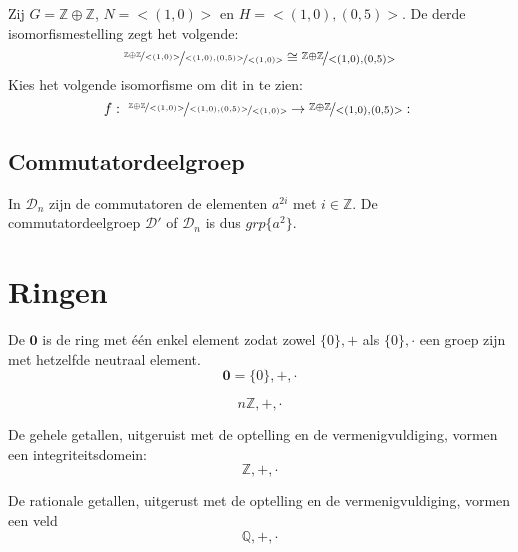 \documentclass[main.tex]{subfiles}
\begin{document}
\begin{vb}
  Zij $G = \mathbb{Z} \oplus \mathbb{Z}$, $N = <(1,0)>$ en $H=<(1,0),(0,5)>$.
  De derde isomorfismestelling zegt het volgende:
  \[
  \nicefrac{\nicefrac{\mathbb{Z} \oplus \mathbb{Z}}{<(1,0)>}}{\nicefrac{<(1,0),(0,5)>}{<(1,0)>}} \cong \nicefrac{\mathbb{Z} \oplus \mathbb{Z}}{<(1,0),(0,5)>}
  \]
  Kies het volgende isomorfisme om dit in te zien:
  \[ f:\ \nicefrac{\nicefrac{\mathbb{Z} \oplus \mathbb{Z}}{<(1,0)>}}{\nicefrac{<(1,0),(0,5)>}{<(1,0)>}} \rightarrow \nicefrac{\mathbb{Z} \oplus \mathbb{Z}}{<(1,0),(0,5)>}:\ \]
\end{vb}


\subsection{Commutatordeelgroep}

\begin{vb}
  In $\mathcal{D}_{n}$ zijn de commutatoren de elementen $a^{2i}$ met $i\in\mathbb{Z}$.
  De commutatordeelgroep $\mathcal{D}'$ of $\mathcal{D}_{n}$ is dus $grp\{a^{2}\}$.
\end{vb}



\section{Ringen}
\label{sec:ringen}

\begin{de}
  De  $\boldsymbol{0}$ is de ring met \'e\'en enkel element zodat zowel $\{0\},+$ als $\{0\},\cdot$ een groep zijn met hetzelfde neutraal element.
  \[ \boldsymbol{0} = \{0\},+,\cdot \]
  \commj {}
\end{de}

\begin{vb}
  \[ n\mathbb{Z},+,\cdot \]
  \commj {} \domein
\end{vb}

\begin{vb}
  De gehele getallen, uitgeruist met de optelling en de vermenigvuldiging, vormen een integriteitsdomein:
  \[ \mathbb{Z},+,\cdot \]
  \commj {} \domein
\end{vb}

\begin{vb}
  De rationale getallen, uitgerust met de optelling en de vermenigvuldiging, vormen een veld 
  \[ \mathbb{Q},+,\cdot \]
\commj {} \domein \lichaam \veld
\end{vb}
\end{document}

